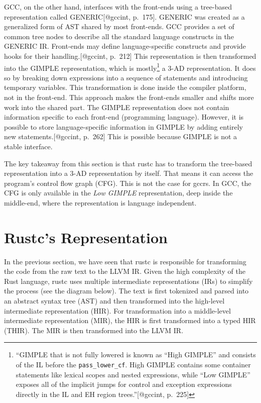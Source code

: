 \documentclass[
  11pt,
]{report}
\begin{document}
GCC, on the other hand, interfaces with the front-ends using a
tree-based representation called GENERIC{[}@gccint, p.~175{]}. GENERIC
was created as a generalized form of AST shared by most front-ends. GCC
provides a set of common tree nodes to describe all the standard
language constructs in the GENERIC IR. Front-ends may define
language-specific constructs and provide hooks for their
handling.{[}@gccint, p.~212{]} This representation is then transformed
into the GIMPLE representation, which is mostly\footnote{``GIMPLE that
  is not fully lowered is known as ``High GIMPLE'' and consists of the
  IL before the \texttt{pass\_lower\_cf}. High GIMPLE contains some
  container statements like lexical scopes and nested expressions, while
  ``Low GIMPLE'' exposes all of the implicit jumps for control and
  exception expressions directly in the IL and EH region
  trees.''{[}@gccint, p.~225{]}} a 3-AD representation. It does so by
breaking down expressions into a sequence of statements and introducing
temporary variables. This transformation is done inside the compiler
platform, not in the front-end. This approach makes the front-ends
smaller and shifts more work into the shared part. The GIMPLE
representation does not contain information specific to each front-end
(programming language). However, it is possible to store
language-specific information in GIMPLE by adding entirely new
statements.{[}@gccint, p.~262{]} This is possible because GIMPLE is not
a stable interface.

The key takeaway from this section is that rustc has to transform the
tree-based representation into a 3-AD representation by itself. That
means it can access the program's control flow graph (CFG). This is not
the case for gccrs. In GCC, the CFG is only available in the \emph{Low
GIMPLE} representation, deep inside the middle-end, where the
representation is language independent.

\section{Rustc's Representation}\label{rustcs-representation}

In the previous section, we have seen that rustc is responsible for
transforming the code from the raw text to the LLVM IR. Given the high
complexity of the Rust language, rustc uses multiple intermediate
representations (IRs) to simplify the process (see the diagram below).
The text is first tokenized and parsed into an abstract syntax tree
(AST) and then transformed into the high-level intermediate
representation (HIR). For transformation into a middle-level
intermediate representation (MIR), the HIR is first transformed into a
typed HIR (THIR). The MIR is then transformed into the LLVM IR.
\end{document}
